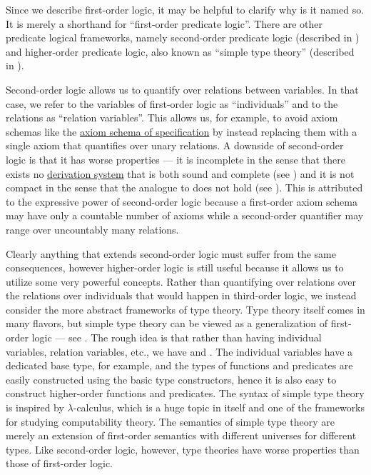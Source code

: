 \begin{remark}\label{rem:higher_order_logic}
  Since we describe first-order logic, it may be helpful to clarify why is it named so. It is merely a shorthand for \enquote{first-order predicate logic}. There are other predicate logical frameworks, namely second-order predicate logic (described in \cite[ch. VIII]{OpenLogicFull}) and higher-order predicate logic, also known as \enquote{simple type theory} (described in \cite[sec. 3]{Farmer2008}).

  Second-order logic allows us to quantify over relations between variables. In that case, we refer to the variables of first-order logic as \enquote{individuals} and to the relations as \enquote{relation variables}. This allows us, for example, to avoid axiom schemas like the \hyperref[def:zfc/specification]{axiom schema of specification} by instead replacing them with a single axiom that quantifies over unary relations. A downside of second-order logic is that it has worse properties --- it is incomplete in the sense that there exists no \hyperref[def:proof_derivation_system]{derivation system} that is both sound and complete (see \cite[thm. 39.6]{OpenLogicFull}) and it is not compact in the sense that the analogue to  does not hold (see \cite[thm. 39.7]{OpenLogicFull}). This is attributed to the expressive power of second-order logic because a first-order axiom schema may have only a countable number of axioms while a second-order quantifier may range over uncountably many relations.

  Clearly anything that extends second-order logic must suffer from the same consequences, however higher-order logic is still useful because it allows us to utilize some very powerful concepts. Rather than quantifying over relations over the relations over individuals that would happen in third-order logic, we instead consider the more abstract frameworks of type theory. Type theory itself comes in many flavors, but simple type theory can be viewed as a generalization of first-order logic --- see \cite[thm. 2]{Farmer2008}. The rough idea is that rather than having individual variables, relation variables, etc., we have  and . The individual variables have a dedicated base type, for example, and the types of functions and predicates are easily constructed using the basic type constructors, hence it is also easy to construct higher-order functions and predicates. The syntax of simple type theory is inspired by \( \lambda \)-calculus, which is a huge topic in itself and one of the frameworks for studying computability theory. The semantics of simple type theory are merely an extension of first-order semantics with different universes for different types. Like second-order logic, however, type theories have worse properties than those of first-order logic.


\end{remark}
